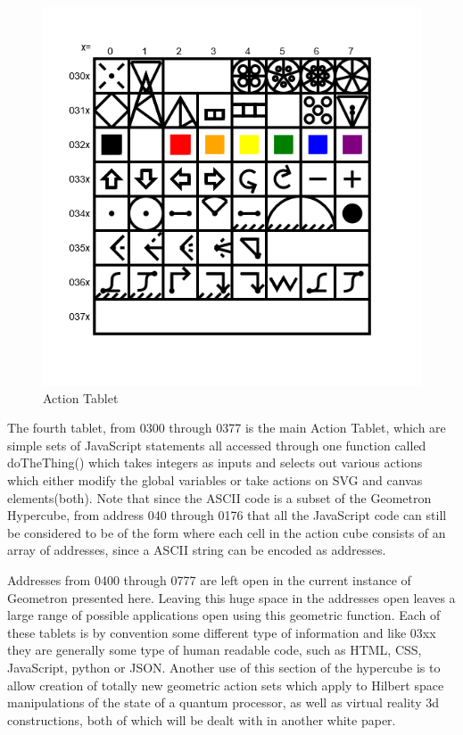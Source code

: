 \documentclass[11pt]{article}
\begin{document}
\begin{figure}

\includegraphics{figures/figure6_actionTablet.png}

\caption{Action Tablet}
\end{figure}

    The fourth tablet, from 0300 through 0377 is the main Action Tablet, which are simple sets of JavaScript statements all accessed through one function called doTheThing() which takes integers as inputs and selects out various actions which either modify the global variables or take actions on SVG and canvas elements(both).  Note that since the ASCII code is a subset of the Geometron Hypercube, from address 040 through 0176 that all the JavaScript code can still be considered to be of the form where each cell in the action cube consists of an array of addresses, since a ASCII string can be encoded as addresses.  

    Addresses from 0400 through 0777 are left open in the current instance of Geometron presented here. Leaving this huge space in the addresses open leaves a large range of possible applications open using this geometric function.  Each of these tablets is by convention some different type of information and like 03xx they are generally some type of human readable code, such as HTML, CSS, JavaScript, python or JSON.  Another use of this section of the hypercube is to allow creation of totally new geometric action sets which apply to Hilbert space manipulations of the state of a quantum processor, as well as virtual reality 3d constructions, both of which will be dealt with in another white paper. 
\end{document}
